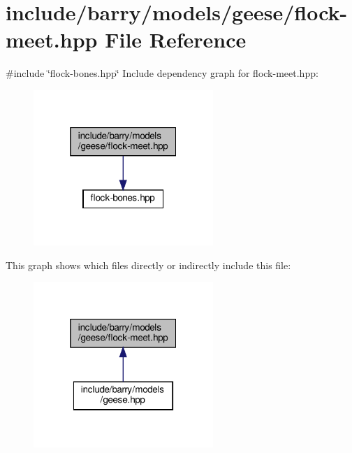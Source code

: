 \hypertarget{flock-meet_8hpp}{}\section{include/barry/models/geese/flock-\/meet.hpp File Reference}
\label{flock-meet_8hpp}
{\ttfamily \#include \char`\"{}flock-\/bones.\+hpp\char`\"{}}\newline
Include dependency graph for flock-\/meet.hpp\+:
\nopagebreak
\begin{figure}[H]
\begin{center}
\leavevmode
\includegraphics[width=193pt]{flock-meet_8hpp__incl}
\end{center}
\end{figure}
This graph shows which files directly or indirectly include this file\+:
\nopagebreak
\begin{figure}[H]
\begin{center}
\leavevmode
\includegraphics[width=193pt]{flock-meet_8hpp__dep__incl}
\end{center}
\end{figure}
